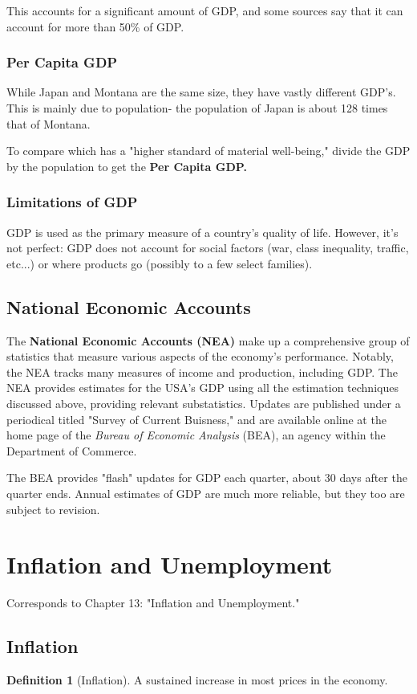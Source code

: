 \documentclass[12pt, a4paper]{article}
\theoremstyle{definition}
\newtheorem{definition}{Definition}
\begin{document}
This accounts for a significant amount of GDP, and some sources say that it can account for more than 50\% of GDP.

\subsubsection{Per Capita GDP}
While Japan and Montana are the same size, they have vastly different GDP's.
This is mainly due to population- the population of Japan is about 128 times that of Montana.

To compare which has a "higher standard of material well-being," divide the GDP by the population to get the \textbf{Per Capita GDP.}

\subsubsection{Limitations of GDP}
GDP is used as the primary measure of a country's quality of life.
However, it's not perfect: GDP does not account for social factors (war, class inequality, traffic, etc...) or where products go (possibly to a few select families).

\subsection{National Economic Accounts}
The \textbf{National Economic Accounts (NEA)} make up a comprehensive group of statistics that measure various aspects of the economy's performance.
Notably, the NEA tracks many measures of income and production, including GDP.
The NEA provides estimates for the USA's GDP using all the estimation techniques discussed above, providing relevant substatistics.
Updates are published under a periodical titled "Survey of Current Buisness," and are available online at the home page of the \textit{Bureau of Economic Analysis} (BEA), an agency within the Department of Commerce.

The BEA provides "flash" updates for GDP each quarter, about 30 days after the quarter ends.
Annual estimates of GDP are much more reliable, but they too are subject to revision.

\newpage

\section{Inflation and Unemployment}
Corresponds to Chapter 13: "Inflation and Unemployment."

\subsection{Inflation}
\begin{definition}[Inflation]
    A sustained increase in most prices in the economy.
\end{definition}
\end{document}
